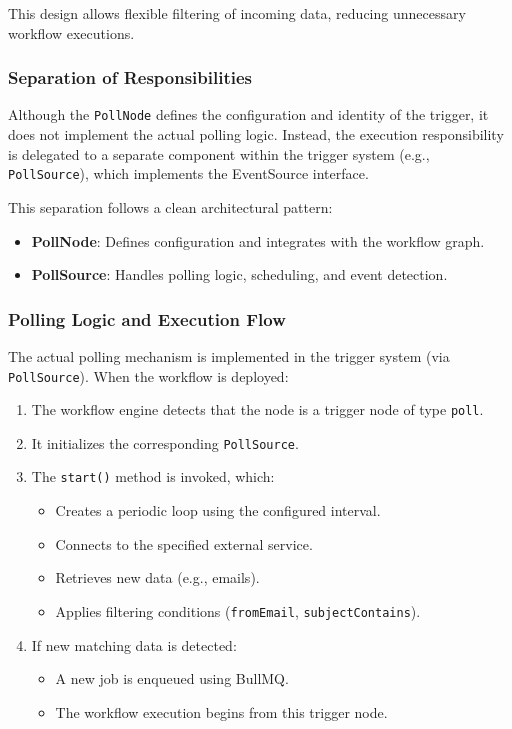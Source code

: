 This design allows flexible filtering of incoming data, reducing unnecessary workflow executions.

\subsubsection{Separation of Responsibilities}

Although the \texttt{PollNode} defines the configuration and identity of the trigger, it does not implement the actual polling logic. Instead, the execution responsibility is delegated to a separate component within the trigger system (e.g., \texttt{PollSource}), which implements the EventSource interface.

This separation follows a clean architectural pattern:

\begin{itemize}
    \item \textbf{PollNode}: Defines configuration and integrates with the workflow graph.
    \item \textbf{PollSource}: Handles polling logic, scheduling, and event detection.
\end{itemize}


\subsubsection{Polling Logic and Execution Flow}

The actual polling mechanism is implemented in the trigger system (via \texttt{PollSource}). When the workflow is deployed:

\begin{enumerate}
    \item The workflow engine detects that the node is a trigger node of type \texttt{poll}.
    \item It initializes the corresponding \texttt{PollSource}.
    \item The \texttt{start()} method is invoked, which:
    \begin{itemize}
        \item Creates a periodic loop using the configured interval.
        \item Connects to the specified external service.
        \item Retrieves new data (e.g., emails).
        \item Applies filtering conditions (\texttt{fromEmail}, \texttt{subjectContains}).
    \end{itemize}
    \item If new matching data is detected:
    \begin{itemize}
        \item A new job is enqueued using BullMQ.
        \item The workflow execution begins from this trigger node.
    \end{itemize}
\end{enumerate}

